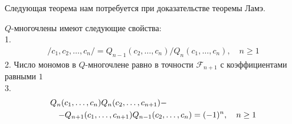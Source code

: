 \documentclass[14pt]{extreport}
\begin{document}
Следующая теорема нам потребуется при доказательстве теоремы Ламэ.
\begin{theorem} $Q$-многочлены имеют следующие свойства:\\
1.
\begin{eqnarray*}
  /c_1, c_2, \ldots, c_n  / = Q_{n-1}(c_2, \ldots, c_n)/
                           Q_n(c_1, \ldots, c_n), \quad n \geq 1
\end{eqnarray*}
2. Число мономов в $Q$-многочлене равно в точности $\mathcal{F}_{n+1}$
 с коэффициентами равными $1$
\\
3.
\begin{eqnarray*}
\lefteqn{Q_{n}(c_1, \ldots, c_n) Q_n(c_2, \ldots, c_{n+1})-}
\\
& & - Q_{n+1}(c_1, \ldots, c_{n+1}) Q_{n-1}(c_2, \ldots, c_{n})
 = (-1)^n,  \quad n \geq 1
\end{eqnarray*}
 \label{l16}
\end{theorem}
\end{document}
